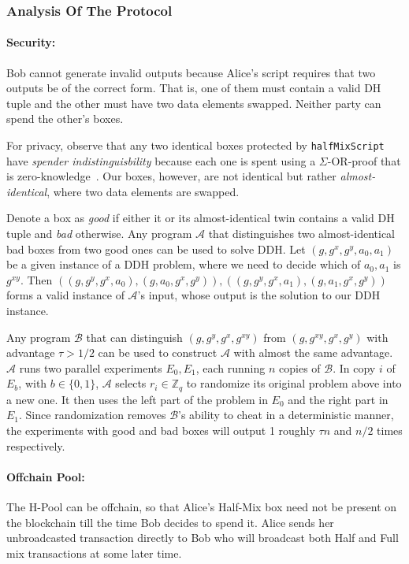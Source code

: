 \documentclass[11pt]{article}
\begin{document}
\subsubsection{Analysis Of The Protocol}
\paragraph{Security:} Bob cannot generate invalid outputs because Alice's script requires that two outputs be of the correct form. That is, one of them must contain a valid DH tuple and the other must have two data elements swapped. Neither party can spend the other's boxes. 

For privacy, observe that any two identical boxes protected by \texttt{halfMixScript} have {\em spender indistinguisbility} because each one is spent using a $\Sigma$-OR-proof that is zero-knowledge~\cite{Dam10}. Our boxes, however, are not identical but rather {\em almost-identical}, where two data elements are swapped. 

Denote a box as {\em good} if either it or its almost-identical twin contains a valid DH tuple and {\em bad} otherwise. Any program $\mathcal{A}$ that distinguishes two almost-identical bad boxes from two good ones can be used to solve DDH. Let $(g, g^x, g^y, a_0, a_1)$ be a given instance of a DDH problem, where we need to decide which of $a_0, a_1$ is $g^{xy}$. 
Then $((g, g^y, g^x, a_0), (g, a_0, g^x, g^y)), ((g, g^y, g^x, a_1), (g, a_1, g^x, g^y))$ forms a valid instance of $\mathcal{A}$'s input, whose output is the solution to our DDH instance. 

Any program $\mathcal{B}$ that can distinguish $(g, g^y, g^x, g^{xy})$ from $(g, g^{xy}, g^x, g^y)$ with advantage $\tau > 1/2$ can be used to construct $\mathcal{A}$ with almost the same advantage. $\mathcal{A}$ runs two parallel experiments $E_0, E_1$, each running $n$ copies of $\mathcal{B}$. In copy $i$ of $E_b$, with $b\in\{0, 1\}$, $\mathcal{A}$ selects $r_i \in \mathbb{Z}_q$ to randomize its original problem above into a new one. It then uses the left part of the problem in $E_0$ and the right part in $E_1$. Since randomization removes $\mathcal{B}$'s ability to cheat in a deterministic manner, the experiments with good and bad boxes will output 1 roughly $\tau n$ and $n/2$ times respectively. 


\paragraph{Offchain Pool:} The H-Pool can be offchain, so that Alice's Half-Mix box need not be present on the blockchain till the time Bob decides to spend it. Alice sends her unbroadcasted transaction directly to Bob who will broadcast both Half and Full mix transactions at some later time. 
\end{document}
